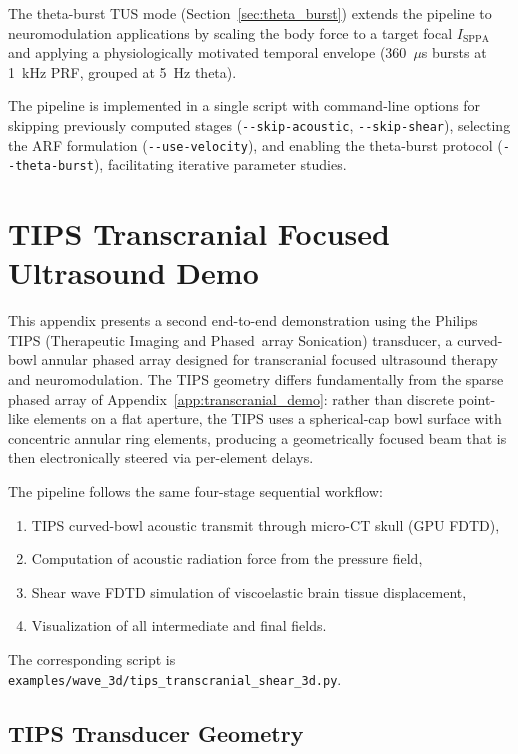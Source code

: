\documentclass[11pt]{article}
\begin{document}
The theta-burst TUS mode (Section~\ref{sec:theta_burst}) extends the pipeline
to neuromodulation applications by scaling the body force to a target focal
$I_{\mathrm{SPPA}}$ and applying a physiologically motivated temporal envelope
(360~$\mu$s bursts at 1~kHz PRF, grouped at 5~Hz theta).

The pipeline is implemented in a single script with
command-line options for skipping previously computed stages
(\texttt{-{}-skip-acoustic}, \texttt{-{}-skip-shear}), selecting the ARF
formulation (\texttt{-{}-use-velocity}), and enabling the theta-burst
protocol (\texttt{-{}-theta-burst}), facilitating iterative parameter
studies.

\section{TIPS Transcranial Focused Ultrasound Demo}
\label{app:tips_demo}

This appendix presents a second end-to-end demonstration using the Philips
TIPS (Therapeutic Imaging and Phased~array Sonication) transducer, a
curved-bowl annular phased array designed for transcranial focused
ultrasound therapy and neuromodulation.  The TIPS geometry differs
fundamentally from the sparse phased array of
Appendix~\ref{app:transcranial_demo}: rather than discrete point-like
elements on a flat aperture, the TIPS uses a spherical-cap bowl surface
with concentric annular ring elements, producing a geometrically focused
beam that is then electronically steered via per-element delays.

The pipeline follows the same four-stage sequential workflow:
\begin{enumerate}[nosep]
  \item TIPS curved-bowl acoustic transmit through micro-CT skull (GPU FDTD),
  \item Computation of acoustic radiation force from the pressure field,
  \item Shear wave FDTD simulation of viscoelastic brain tissue displacement,
  \item Visualization of all intermediate and final fields.
\end{enumerate}

\noindent
The corresponding script is
\texttt{examples/wave\_3d/tips\_transcranial\_shear\_3d.py}.

\subsection{TIPS Transducer Geometry}
\end{document}
